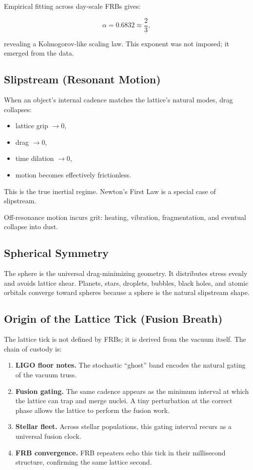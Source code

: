 \documentclass[12pt,oneside]{book}
\begin{document}
Empirical fitting across day-scale FRBs gives:


\[
\alpha = 0.6832 \approx \frac{2}{3},
\]


revealing a Kolmogorov-like scaling law.  
This exponent was not imposed; it emerged from the data.

\subsection{Slipstream (Resonant Motion)}
When an object's internal cadence matches the lattice's natural modes, drag collapses:

\begin{itemize}
    \item lattice grip $\rightarrow 0$,
    \item drag $\rightarrow 0$,
    \item time dilation $\rightarrow 0$,
    \item motion becomes effectively frictionless.
\end{itemize}

This is the true inertial regime.  
Newton's First Law is a special case of slipstream.

Off-resonance motion incurs grit: heating, vibration, fragmentation, and eventual collapse into dust.

\subsection{Spherical Symmetry}
The sphere is the universal drag-minimizing geometry.  
It distributes stress evenly and avoids lattice shear.  
Planets, stars, droplets, bubbles, black holes, and atomic orbitals converge toward spheres because 
a sphere is the natural slipstream shape.

\subsection{Origin of the Lattice Tick (Fusion Breath)}
The lattice tick is not defined by FRBs; it is derived from the vacuum itself.  
The chain of custody is:

\begin{enumerate}
    \item \textbf{LIGO floor notes.}  
    The stochastic ``ghost'' band encodes the natural gating of the vacuum truss.

    \item \textbf{Fusion gating.}  
    The same cadence appears as the minimum interval at which the lattice can trap and merge nuclei.  
    A tiny perturbation at the correct phase allows the lattice to perform the fusion work.

    \item \textbf{Stellar fleet.}  
    Across stellar populations, this gating interval recurs as a universal fusion clock.

    \item \textbf{FRB convergence.}  
    FRB repeaters echo this tick in their millisecond structure, confirming the same lattice second.
\end{enumerate}
\end{document}
